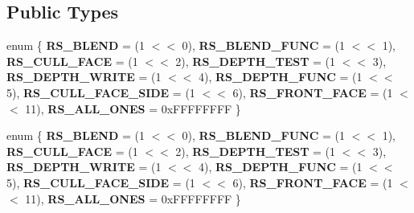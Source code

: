 \subsection*{Public Types}
\begin{DoxyCompactItemize}
\item 
enum \{ \newline
{\bfseries R\+S\+\_\+\+B\+L\+E\+ND} = (1 $<$$<$ 0), 
{\bfseries R\+S\+\_\+\+B\+L\+E\+N\+D\+\_\+\+F\+U\+NC} = (1 $<$$<$ 1), 
{\bfseries R\+S\+\_\+\+C\+U\+L\+L\+\_\+\+F\+A\+CE} = (1 $<$$<$ 2), 
{\bfseries R\+S\+\_\+\+D\+E\+P\+T\+H\+\_\+\+T\+E\+ST} = (1 $<$$<$ 3), 
\newline
{\bfseries R\+S\+\_\+\+D\+E\+P\+T\+H\+\_\+\+W\+R\+I\+TE} = (1 $<$$<$ 4), 
{\bfseries R\+S\+\_\+\+D\+E\+P\+T\+H\+\_\+\+F\+U\+NC} = (1 $<$$<$ 5), 
{\bfseries R\+S\+\_\+\+C\+U\+L\+L\+\_\+\+F\+A\+C\+E\+\_\+\+S\+I\+DE} = (1 $<$$<$ 6), 
{\bfseries R\+S\+\_\+\+F\+R\+O\+N\+T\+\_\+\+F\+A\+CE} = (1 $<$$<$ 11), 
\newline
{\bfseries R\+S\+\_\+\+A\+L\+L\+\_\+\+O\+N\+ES} = 0x\+F\+F\+F\+F\+F\+F\+FF
 \}
\item 
enum \{ \newline
{\bfseries R\+S\+\_\+\+B\+L\+E\+ND} = (1 $<$$<$ 0), 
{\bfseries R\+S\+\_\+\+B\+L\+E\+N\+D\+\_\+\+F\+U\+NC} = (1 $<$$<$ 1), 
{\bfseries R\+S\+\_\+\+C\+U\+L\+L\+\_\+\+F\+A\+CE} = (1 $<$$<$ 2), 
{\bfseries R\+S\+\_\+\+D\+E\+P\+T\+H\+\_\+\+T\+E\+ST} = (1 $<$$<$ 3), 
\newline
{\bfseries R\+S\+\_\+\+D\+E\+P\+T\+H\+\_\+\+W\+R\+I\+TE} = (1 $<$$<$ 4), 
{\bfseries R\+S\+\_\+\+D\+E\+P\+T\+H\+\_\+\+F\+U\+NC} = (1 $<$$<$ 5), 
{\bfseries R\+S\+\_\+\+C\+U\+L\+L\+\_\+\+F\+A\+C\+E\+\_\+\+S\+I\+DE} = (1 $<$$<$ 6), 
{\bfseries R\+S\+\_\+\+F\+R\+O\+N\+T\+\_\+\+F\+A\+CE} = (1 $<$$<$ 11), 
\newline
{\bfseries R\+S\+\_\+\+A\+L\+L\+\_\+\+O\+N\+ES} = 0x\+F\+F\+F\+F\+F\+F\+FF
 \}
\end{DoxyCompactItemize}
